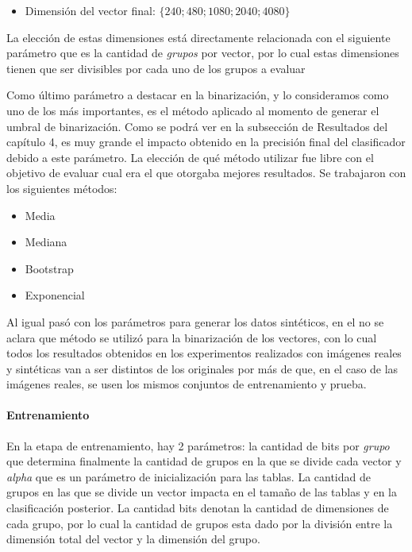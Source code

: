 	\begin{itemize}
		\item Dimensión del vector final: $\{ 240; 480; 1080; 2040;  4080 \}$
	\end{itemize}
	
	La elección de estas dimensiones está directamente relacionada con el siguiente parámetro que es la cantidad de \textit{grupos} por vector, por lo cual estas dimensiones tienen que ser divisibles por cada uno de los grupos a evaluar
	
	Como último parámetro a destacar en la binarización, y lo consideramos como uno de los más importantes, es el método aplicado al momento de generar el umbral de binarización. Como se podrá ver en la subsección de Resultados del capítulo 4, es muy grande el impacto obtenido en la precisión final del clasificador debido a este parámetro. La elección de qué método utilizar fue libre con el objetivo de evaluar cual era el que otorgaba mejores resultados. Se trabajaron con los siguientes métodos:

	\begin{itemize}
		\item Media
		\item Mediana
		\item Bootstrap
		\item Exponencial
	\end{itemize}
	
	Al igual pasó con los parámetros para generar los datos sintéticos, en el \cite{wang} no se aclara que método se utilizó para la binarización de los vectores, con lo cual todos los resultados obtenidos en los experimentos realizados con imágenes reales y sintéticas van a ser distintos de los originales por más de que, en el caso de las imágenes reales, se usen los mismos conjuntos de entrenamiento y prueba. 
		
	\paragraph{Entrenamiento}

	En la etapa de entrenamiento, hay 2 parámetros: la cantidad de bits por \textit{grupo} que determina finalmente la cantidad de grupos en la que se divide cada vector y \textit{alpha} que es un parámetro de inicialización para las tablas. La cantidad de grupos en las que se divide un vector impacta en el tamaño de las tablas y en la clasificación posterior. La cantidad bits denotan la cantidad de dimensiones de cada grupo, por lo cual  la cantidad de grupos esta dado por la división entre la dimensión total del vector y la dimensión del grupo.

